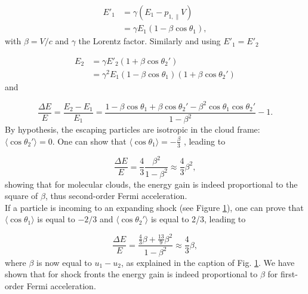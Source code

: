 \begin{figure}[ht]
%
\label{fig:cloud}
\end{figure}

\begin{equation}
\begin{split}
E'_1 &= \gamma \left(E_1 - p_{1,\parallel} V\right) \\
&= \gamma E_1 \left(1-\beta \cos \theta_1\right),
\end{split}
\end{equation}
with $\beta = V/c$ and $\gamma$ the Lorentz factor. Similarly and using $E'_1 = E'_2$

\begin{equation}
\begin{split}
E_2 &= \gamma E'_2 \left(1+\beta \cos \theta_2'\right)\\
&=\gamma^2 E_1 \left(1-\beta \cos \theta_1\right) \left( 1 + \beta \cos \theta_2'\right)
\end{split}
\end{equation}
and

\begin{equation}
\frac{\Delta E}{E} = \frac{E_2 -E_1}{E_1} = \frac{1 - 
\beta \cos \theta_1 + \beta \cos \theta_2' - \beta^2 \cos \theta_1 \cos \theta_2'}{1-\beta^2} -1.
\end{equation}
By hypothesis, the escaping particles are isotropic in the cloud frame: $\langle \cos \theta_2' \rangle = 0$. One can show that $\langle \cos \theta_1 \rangle = -\frac{\beta}{3}$ \cite{Gaisser:2016uoy}, leading to

\begin{equation}
\frac{\Delta E}{E} = \frac{4}{3} \frac{\beta^2}{1-\beta^2} \approx \frac{4}{3} \beta^2,
\end{equation}
showing that for molecular clouds, the energy gain is indeed proportional to the square of $\beta$, thus second-order Fermi acceleration.\\
\newline
If a particle is incoming to an expanding shock (see Figure \ref{fig:cloud}), one can prove that $\langle \cos \theta_1\rangle$ is equal to $-2/3$ and $\langle \cos \theta_2'\rangle$ is equal to 2/3, leading to

\begin{equation}
\frac{\Delta E}{E} = \frac{\frac{4}{3}\beta + \frac{13}{9}\beta^2}{1-\beta^2} \approx \frac{4}{3} \beta,
\end{equation}
where $\beta$ is now equal to $u_1 -u_2$, as explained in the caption of Fig. \ref{fig:cloud}. We have shown that for shock fronts the energy gain is indeed proportional to $\beta$ for first-order Fermi acceleration. 

